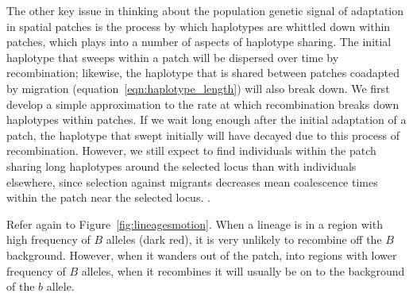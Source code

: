 \documentclass{article}
\begin{document}
The other key issue in thinking about the population genetic signal of adaptation in spatial patches 
is the process by which haplotypes are whittled down within patches, 
which plays into a number of aspects of haplotype sharing. 
The initial haplotype that sweeps within a patch 
will be dispersed over time by recombination;
likewise, the haplotype that is shared between patches coadapted by migration
(equation~\ref{eqn:haplotype_length}) will also break down. 
We first develop a simple approximation to the rate 
at which recombination breaks down haplotypes within patches. 
If we wait long enough after the initial adaptation of a patch,
the haplotype that swept initially will have decayed due to this process of recombination. 
However, we still expect to find individuals within the patch sharing long haplotypes around the selected locus
than with individuals elsewhere,
since selection against migrants 
decreases mean coalescence times within the patch near the selected locus.
\citep{bartonpaper,charlesworths}. 

Refer again to Figure~\ref{fig:lineagesmotion}. 
When a lineage is in a region with high frequency of $B$ alleles (dark red), 
it is very unlikely to recombine off the $B$ background. 
However, when it wanders out of the patch,
into regions with lower frequency of $B$ alleles,
when it recombines it will
usually be on to the background of the $b$ allele.
\end{document}
